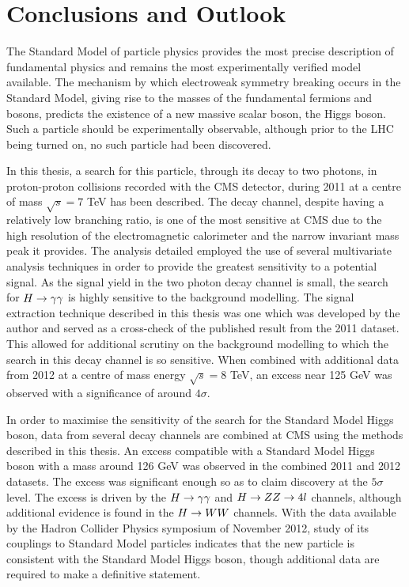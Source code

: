 \chapter{Conclusions and Outlook}
\label{chap:conclusions}

The Standard Model of particle physics provides the most precise description of 
fundamental physics and remains  the most experimentally verified
model available. The mechanism by which electroweak symmetry breaking occurs 
in the Standard Model, giving rise to the masses of the fundamental fermions and
bosons, predicts the existence of a new massive scalar boson, the Higgs boson.
Such a particle should be experimentally observable, although prior to the LHC being
turned on, no such particle had been discovered.

In this thesis, a search for this particle, through its decay to two photons, 
in proton-proton collisions recorded with the CMS detector, during 2011 at a centre of mass $\sqrt{s}=7$ TeV
has been described. 
The decay channel, despite having a 
relatively low branching ratio, is one of the most sensitive at CMS 
due to the high resolution 
of the electromagnetic calorimeter and the narrow invariant mass peak it provides.
The analysis detailed employed the use of several multivariate analysis techniques
in order to provide the greatest sensitivity to a potential signal.
As the signal yield in the two photon decay channel is small, 
the search for $H\rightarrow\gamma\gamma$ is highly sensitive to the background modelling.
The signal extraction technique described in this thesis was one which was 
developed by the author and served as a cross-check of the published result from the 2011 dataset.
This allowed for additional scrutiny on the background modelling 
to which the search in this decay channel is so sensitive. When combined with additional 
data from 2012 at a centre of mass energy $\sqrt{s}=8$ TeV, an excess near 125 GeV 
was observed with a significance of around $4\sigma$.

In order to maximise the sensitivity of the search for the Standard Model Higgs boson,
data from several decay channels are combined at CMS using the methods described in this thesis. 
An excess compatible with a Standard Model Higgs boson with a mass around 126 GeV was observed 
in the combined 2011 and 2012 datasets. The excess was 
significant enough so as to claim discovery at the $5\sigma$ level. The excess is driven 
by the $H\rightarrow\gamma\gamma$ and  $H\rightarrow ZZ \rightarrow 4l$ channels, although additional evidence is found in the $H\rightarrow WW$ channels. 
With the data available by the Hadron Collider Physics symposium of November 2012,
study of its couplings to Standard Model particles indicates that the new particle is 
consistent with the Standard Model Higgs boson, though additional data are required to 
make a definitive statement.

